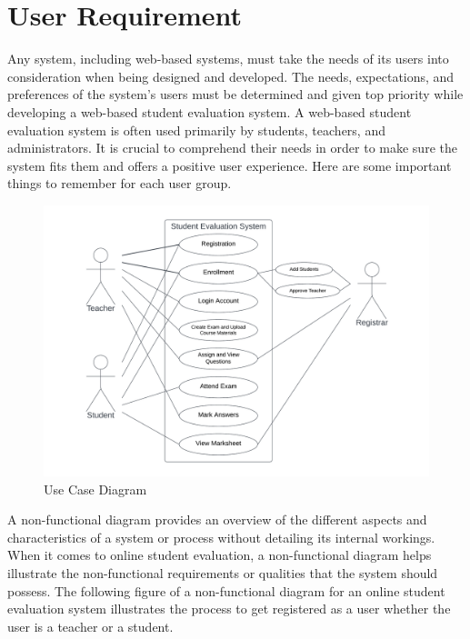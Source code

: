 \section{User Requirement}
Any system, including web-based systems, must take the needs of its users into consideration when being designed and developed. The needs, expectations, and preferences of the system's users must be determined and given top priority while developing a web-based student evaluation system. A web-based student evaluation system is often used primarily by students, teachers, and administrators. It is crucial to comprehend their needs in order to make sure the system fits them and offers a positive user experience. Here are some important things to remember for each user group.
\begin{figure}[H]
    \centering
    \includegraphics[scale=.2]{img/caseuml.png}
    \caption{Use Case Diagram}
    \label{fig:uml}
\end{figure}
A non-functional diagram provides an overview of the different aspects and characteristics of a system or process without detailing its internal workings. When it comes to online student evaluation, a non-functional diagram helps illustrate the non-functional requirements or qualities that the system should possess. The following figure of a non-functional diagram for an online student evaluation system illustrates the process to get registered as a user whether the user is a teacher or a student.\\

